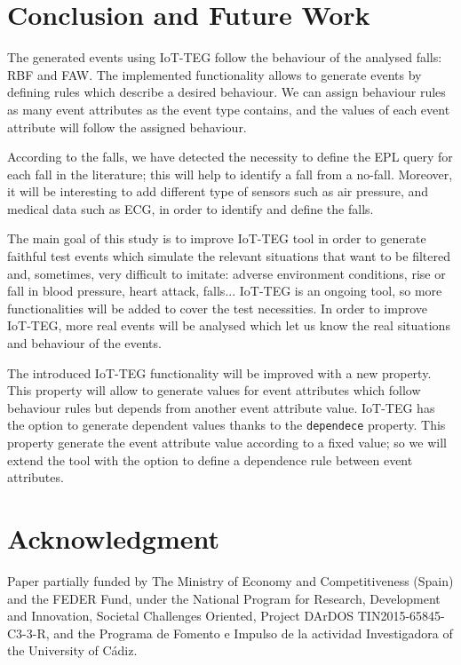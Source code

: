 \documentclass[conference]{IEEEtran}
\theoremstyle{definition}
\begin{document}
\section{Conclusion and Future Work}
\label{sec:conclusions}

The generated events using IoT-TEG follow the behaviour of the analysed falls: RBF and FAW. The implemented functionality 
allows to generate events by defining rules which describe a desired behaviour. We can assign behaviour rules as many 
event attributes as the event type contains, and the values of each event attribute will follow the assigned behaviour.

According to the falls, we have detected the necessity to define the EPL query for each fall in the literature; this will
help to identify a fall from a no-fall. Moreover, it will be interesting to add different type of sensors such as air
pressure, and medical data such as ECG, in order to identify and define the falls.

The main goal of this study is to improve IoT-TEG tool in order to generate faithful test events which simulate the 
relevant situations that want to be filtered and, sometimes, very difficult to imitate: adverse environment conditions, 
rise or fall in blood pressure, heart attack, falls... IoT-TEG is an ongoing tool, so more functionalities will be added
to cover the test necessities. In order to improve IoT-TEG, more real events will be analysed which let us know 
the real situations and behaviour of the events.

The introduced IoT-TEG functionality will be improved with a new property. This property will allow to generate values 
for event attributes which follow behaviour rules but depends from another event attribute value. IoT-TEG has the option
to generate dependent values thanks to the \texttt{dependece} property. This property generate the event attribute value 
according to a fixed value; so we will extend the tool with the option to define a dependence rule between event attributes. 

\section*{Acknowledgment}

Paper partially funded by The Ministry of Economy and Competitiveness (Spain) and the FEDER Fund, under the National Program for 
Research, Development and Innovation, Societal Challenges Oriented, Project DArDOS TIN2015-65845-C3-3-R, and the
Programa de Fomento e Impulso de la actividad Investigadora of the University of Cádiz.




\end{document}
